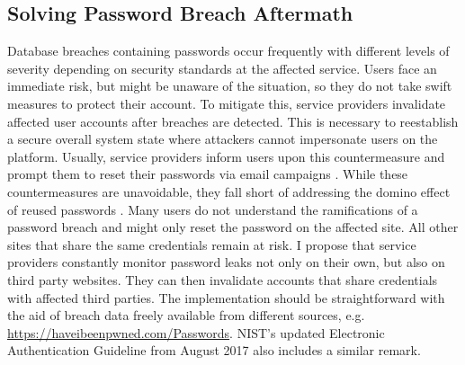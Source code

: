 \subsection{Solving Password Breach Aftermath}
Database breaches containing passwords occur frequently with different levels of severity depending on security standards at the affected service. 
Users face an immediate risk, but might be unaware of the situation, so they do not take swift measures to protect their account. 
To mitigate this, service providers invalidate affected user accounts after breaches are detected. This is necessary to reestablish a secure overall system state where attackers cannot impersonate users on the platform. Usually, service providers inform users upon this countermeasure and prompt them to reset their passwords via email campaigns \cite{Huh2017TooBusy}. 
While these countermeasures are unavoidable, they fall short of addressing the domino effect of reused passwords \cite{Ives2004DominoEffectReuse}. Many users do not understand the ramifications of a password breach and might only reset the password on the affected site. All other sites that share the same credentials remain at risk. 
I propose that service providers constantly monitor password leaks not only on their own, but also on third party websites. They can then invalidate accounts that share credentials with affected third parties. The implementation should be straightforward with the aid of breach data freely available from different sources, e.g. \url{https://haveibeenpwned.com/Passwords}. NIST's updated Electronic Authentication Guideline from August 2017 also includes a similar remark. 

